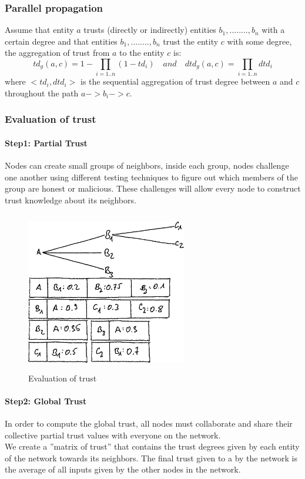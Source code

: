 \subsubsection*{Parallel propagation}
Assume that entity $a$ trusts (directly or indirectly) entities $b_1,........,b_n$ with a certain degree and that entities $b_1,........,b_n$ trust the entity $c$ with some degree, the aggregation of trust from $a$ to the entity $c$ is:
$$td_g(a,c)=1-\prod_{i=1..n}(1-td_i) \quad and \quad dtd_g(a,c)=\prod_{i=1..n}dtd_i$$
where $<td_i,dtd_i>$ is the sequential aggregation of trust degree between $a$ and $c$ throughout the path $a->b_i->c$.

\subsubsection{Evaluation of trust}
\paragraph{Step1: Partial Trust}
Nodes can create small groups of neighbors, inside each group, nodes challenge one another using different testing techniques to figure out which members of the group are honest or malicious. 
These challenges will allow every node to construct trust knowledge about its neighbors. 
\begin{figure}[H]
    \centering
    \includegraphics[width=7cm,height=7cm,keepaspectratio]{../whitepaper/images/reputation.png}
    \caption{Evaluation of trust}
    \label{fig:Evaluation of trust}
    \end{figure}

\paragraph{Step2: Global Trust}
In order to compute the global trust, all nodes must collaborate and share their collective partial trust values with everyone on the network. 
\\We create a ”matrix of trust” that contains the trust degrees given by each entity of the network towards its neighbors. 
The final trust given to a by the network is the average of all inputs given by the other nodes in the network.





